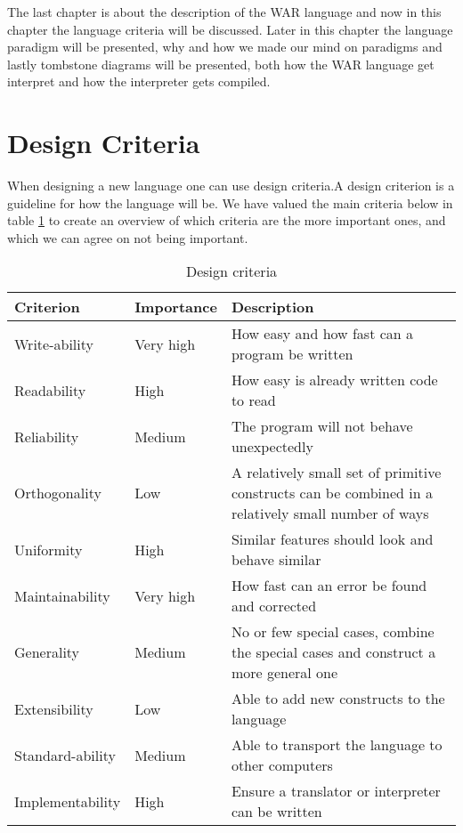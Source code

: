 The last chapter is about the description of the WAR language and now in this chapter the language criteria will be discussed. Later in this chapter the language paradigm will be presented, why and how we made our mind on paradigms and lastly tombstone diagrams will be presented, both how the WAR language get interpret and how the interpreter gets compiled.
\section{Design Criteria}\label{chap:DesCrit}
When designing a new language one can use design criteria.A design criterion is a guideline for how the language will be. 
We have valued the main criteria below in table \ref{tab:criteria_tabular} to create an overview of which criteria are the more important ones, and which we can agree on not being important.   

\begin{table}[H]
	\begin{tabular}{| 	l	|	 l	| p{7cm}	|}
	\hline
	Criterion			&	Importance	&		Description	\\	
	\hline
	Write-ability 		& 	Very high	&		How easy and how fast can a program be written\\
	Readability			& 	High		&		How easy is already written code to read\\
	Reliability			& 	Medium		&		The program will not behave unexpectedly\\
	Orthogonality		& 	Low			&		A relatively small set of primitive constructs can be combined in a relatively small number of ways\\
	Uniformity			& 	High		&		Similar features should look and behave similar\\
	Maintainability		& 	Very high	&		How fast can an error be found and corrected\\
	Generality			& 	Medium		&		No or few special cases, combine the special cases and construct a more general one\\
	Extensibility		& 	Low			&		Able to add new constructs to the language\\
	Standard-ability	& 	Medium		&		Able to transport the language to other computers\\
	Implementability	& 	High		&		Ensure a translator or interpreter can be written\\
	\hline
	\end{tabular}
	\caption{Design criteria \cite{criteria}}
	\label{tab:criteria_tabular}
\end{table}



